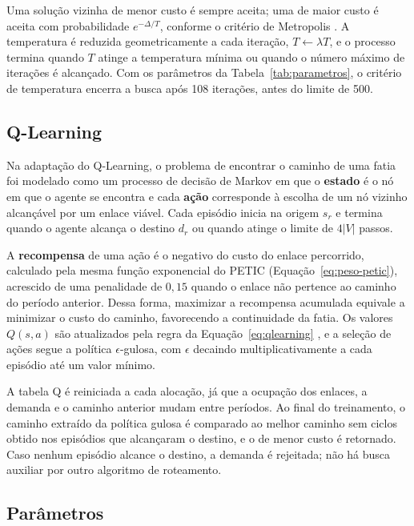 Uma solução vizinha de menor custo é sempre aceita; uma de maior custo é aceita com probabilidade $e^{-\Delta/T}$, conforme o critério de Metropolis \cite{kirkpatrick1983}. A temperatura é reduzida geometricamente a cada iteração, $T \leftarrow \lambda T$, e o processo termina quando $T$ atinge a temperatura mínima ou quando o número máximo de iterações é alcançado. Com os parâmetros da Tabela~\ref{tab:parametros}, o critério de temperatura encerra a busca após 108 iterações, antes do limite de 500.

\subsection{Q-Learning}
\label{subsec:impl-qlearning}

Na adaptação do Q-Learning, o problema de encontrar o caminho de uma fatia foi modelado como um processo de decisão de Markov em que o \textbf{estado} é o nó em que o agente se encontra e cada \textbf{ação} corresponde à escolha de um nó vizinho alcançável por um enlace viável. Cada episódio inicia na origem $s_r$ e termina quando o agente alcança o destino $d_r$ ou quando atinge o limite de $4|V|$ passos.

A \textbf{recompensa} de uma ação é o negativo do custo do enlace percorrido, calculado pela mesma função exponencial do PETIC (Equação~\ref{eq:peso-petic}), acrescido de uma penalidade de $0{,}15$ quando o enlace não pertence ao caminho do período anterior. Dessa forma, maximizar a recompensa acumulada equivale a minimizar o custo do caminho, favorecendo a continuidade da fatia. Os valores $Q(s,a)$ são atualizados pela regra da Equação~\ref{eq:qlearning} \cite{watkins1992}, %
e a seleção de ações segue a política $\epsilon$-gulosa, com $\epsilon$ decaindo multiplicativamente a cada episódio até um valor mínimo.

A tabela Q é reiniciada a cada alocação, já que a ocupação dos enlaces, a demanda e o caminho anterior mudam entre períodos. Ao final do treinamento, o caminho extraído da política gulosa é comparado ao melhor caminho sem ciclos obtido nos episódios que alcançaram o destino, e o de menor custo é retornado. Caso nenhum episódio alcance o destino, a demanda é rejeitada; não há busca auxiliar por outro algoritmo de roteamento.

\subsection{Parâmetros}
\label{subsec:parametros}


